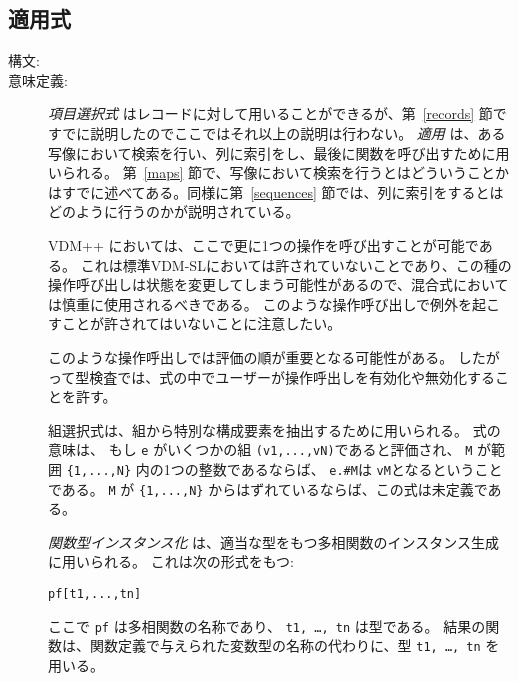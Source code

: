 \documentclass[\pformat,12pt]{jarticle}
\newcommand{\vdmslpp}[2]{%
#2
}
\newcommand{\vdmpp}{VDM++}
\begin{document}
\subsection{適用式}\label{app-expr}

\begin{description}
\item[構文:]





\item[意味定義:] 
  {\it 項目選択式} はレコードに対して用いることができるが、第~\ref{records} 節ですでに説明したのでここではそれ以上の説明は行わない。
 {\it 適用} は、ある写像において検索を行い、列に索引をし、最後に関数を呼び出すために用いられる。
第~\ref{maps} 節で、写像において検索を行うとはどういうことかはすでに述べてある。同様に第~\ref{sequences} 節では、列に索引をするとはどのように行うのかが説明されている。

 \vdmslpp{VDM-SL}{\vdmpp}においては、ここで更に1つの操作を呼び出すことが可能である。
これは標準VDM-SLにおいては許されていないことであり、この種の操作呼び出しは状態を変更してしまう可能性があるので、混合式においては慎重に使用されるべきである。
このような操作呼び出しで例外を起こすことが許されてはいないことに注意したい。

 このような操作呼出しでは評価の順が重要となる可能性がある。
したがって型検査では、式の中でユーザーが操作呼出しを有効化や無効化することを許す。

 組選択式は、組から特別な構成要素を抽出するために用いられる。
式の意味は、 もし \texttt{e} がいくつかの組 \texttt{(v1,...,vN)}であると評価され、 \texttt{M} が範囲 \verb+{1,...,N}+ 内の1つの整数であるならば、 \texttt{e.\#M}は \texttt{vM}となるということである。
\texttt{M} が \verb+{1,...,N}+ からはずれているならば、この式は未定義である。

 {\it 関数型インスタンス化\/} は、適当な型をもつ多相関数のインスタンス生成に用いられる。
これは次の形式をもつ:
  \begin{alltt}
    pf [ t1, ..., tn ]
  \end{alltt}
 ここで {\tt pf} は多相関数の名称であり、 {\tt t1,  \ldots, tn} は型である。
結果の関数は、関数定義で与えられた変数型の名称の代わりに、型 {\tt  t1, \ldots, tn} を用いる。


\end{description}
\end{document}
